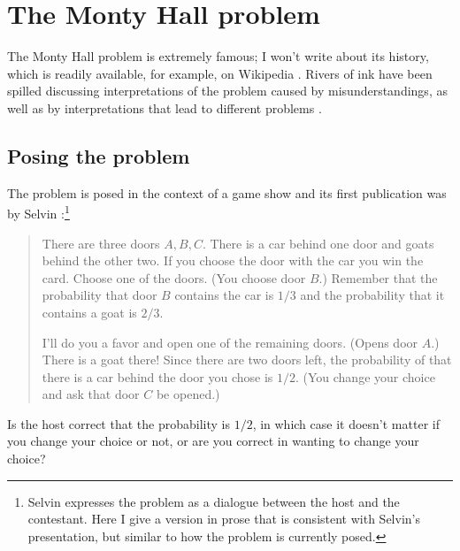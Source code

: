 \documentclass[11pt,a4paper]{article}
\begin{document}

\section{The Monty Hall problem}

The Monty Hall problem is extremely famous; I won't write about its history, which is readily available, for example, on Wikipedia \cite{monty}. Rivers of ink have been spilled discussing interpretations of the problem caused by misunderstandings, as well as by interpretations that lead to different problems \cite{jason}.

\subsection*{Posing the problem}
The problem is posed in the context of a game show and its first publication was by Selvin \cite{selvin}:\footnote{Selvin expresses the problem as a dialogue between the host and the contestant. Here I give a version in prose that is consistent with Selvin's presentation, but similar to how the problem is currently posed.}
\begin{quote}
There are three doors $A, B, C$. There is a car behind one door and goats behind the other two. If you choose the door with the car you win the card. Choose one of the doors. (You choose door $B$.) Remember that the probability that door $B$ contains the car is $1/3$ and the probability that it contains a goat is $2/3$.

I'll do  you a favor and open one of the remaining doors. (Opens door $A$.) There is a goat there! Since there are two doors left, the probability of that there is a car behind the door you chose is $1/2$. (You change your choice and ask that door $C$ be opened.)
\end{quote}
Is the host correct that the probability is $1/2$, in which case it doesn't matter if you change your choice or not, or are you correct in wanting to change your choice?
\end{document}
